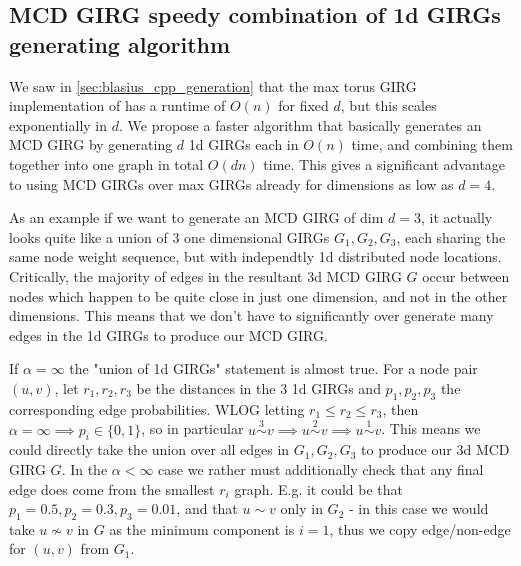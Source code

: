 

\subsection{MCD GIRG speedy combination of 1d GIRGs generating algorithm}
We saw in \cref{sec:blasius_cpp_generation} that the max torus GIRG implementation of \cite{blasius2022efficiently} has a runtime of $O(n)$ for fixed $d$, but this scales exponentially in $d$. We propose a faster algorithm that basically generates an MCD GIRG by generating $d$ 1d GIRGs each in $O(n)$ time, and combining them together into one graph in total $O(dn)$ time. This gives a significant advantage to using MCD GIRGs over max GIRGs already for dimensions as low as $d=4$.

As an example if we want to generate an MCD GIRG of dim $d=3$, it actually looks quite like a union of $3$ one dimensional GIRGs $G_1, G_2, G_3$, each sharing the same node weight sequence, but with independtly 1d distributed node locations. Critically, the majority of edges in the resultant 3d MCD GIRG $G$ occur between nodes which happen to be quite close in just one dimension, and not in the other dimensions. This means that we don't have to significantly over generate many edges in the 1d GIRGs to produce our MCD GIRG.

If $\alpha=\infty$ the "union of 1d GIRGs" statement is almost true. For a node pair $(u,v)$, let $r_1, r_2, r_3$ be the distances in the $3$ 1d GIRGs and $p_1, p_2, p_3$ the corresponding edge probabilities. WLOG letting $r_1 \leq r_2 \leq r_3$, then $\alpha = \infty \implies p_i \in \{0, 1\}$, so in particular $u \stackrel{3}{\sim} v \implies u \stackrel{2}{\sim} v \implies u \stackrel{1}{\sim} v$. This means we could directly take the union over all edges in $G_1, G_2, G_3$ to produce our 3d MCD GIRG $G$. In the $\alpha < \infty$ case we rather must additionally check that any final edge does come from the smallest $r_i$ graph. E.g. it could be that $p_1 = 0.5, p_2 = 0.3, p_3 = 0.01$, and that $u \sim v$ only in $G_2$ - in this case we would take $u \not \sim v$ in $G$ as the minimum component is $i=1$, thus we copy edge/non-edge for $(u, v)$ from $G_1$. 

